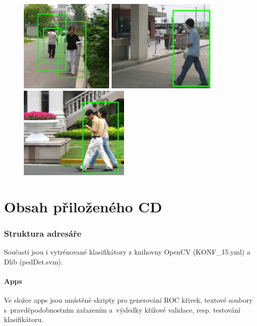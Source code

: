 \begin{figure}[H]
\centering
\includegraphics[keepaspectratio, max height=4.5cm,]{figures/ped/d/10}%
\hfill %
\includegraphics[keepaspectratio, max height=4.5cm,]{figures/ped/d/11}%
\hfill %
\includegraphics[keepaspectratio, max height=4.5cm,]{figures/ped/d/12}%
\end{figure}

\newpage
\section{Obsah přiloženého CD}
\subsubsection*{Struktura adresáře}
\hfill \break
Součastí jsou i vytrénované klasifikátory z knihovny OpenCV (KONF\_15.yml) a Dlib (pedDet.svm).
\paragraph*{Apps}
Ve složce apps jsou umístěné skripty pro generování ROC křivek, textové soubory s~pravděpodobnostním zařazením a~výsledky křížové validace, resp. testování klasifikátoru. 
